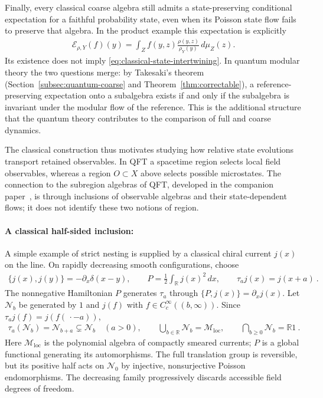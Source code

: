 \documentclass[a4paper,11pt]{article}
\theoremstyle{definition}
\newcommand{\mN}{\mathcal{N}}
\newcommand{\mM}{\mathcal{M}}
\newcommand{\mE}{\mathcal{E}}
\begin{document}
Finally, every classical coarse algebra still admits a state-preserving conditional expectation for a faithful probability state, even when its Poisson state flow fails to preserve that algebra. In the product example this expectation is explicitly
\begin{align}
    \mE_{\rho,Y}(f)(y)=\int_Z f(y,z)\frac{\rho(y,z)}{\rho_Y(y)}\,d\mu_Z(z).
\end{align}
Its existence does not imply \eqref{eq:classical-state-intertwining}. In quantum modular theory the two questions merge: by Takesaki's theorem (Section~\ref{subsec:quantum-coarse} and Theorem~\ref{thm:correctable}), a reference-preserving expectation onto a subalgebra exists if and only if the subalgebra is invariant under the modular flow of the reference. This is the additional structure that the quantum theory contributes to the comparison of full and coarse dynamics.

The classical construction thus motivates studying how relative state evolutions transport retained observables. In QFT a spacetime region selects local field observables, whereas a region $O\subset X$ above selects possible microstates. The connection to the subregion algebras of QFT, developed in the companion paper~\cite{companionQFT}, is through inclusions of observable algebras and their state-dependent flows; it does not identify these two notions of region.

\paragraph{A classical half-sided inclusion:}
A simple example of strict nesting is supplied by a classical chiral current $j(x)$ on the line. On rapidly decreasing smooth configurations, choose
\begin{align}
    \{j(x),j(y)\}=-\partial_x\delta(x-y),
    \qquad P=\frac12\int_{\mathbb R}j(x)^2\,dx,
    \qquad \tau_a j(x)=j(x+a)\ .
\end{align}
The nonnegative Hamiltonian $P$ generates $\tau_a$ through $\{P,j(x)\}=\partial_xj(x)$. Let $\mN_b$ be generated by $1$ and $j(f)$ with $f\in C_c^\infty((b,\infty))$. Since $\tau_a j(f)=j(f(\,\cdot-a))$,
\begin{align}
    \tau_a(\mN_b)=\mN_{b+a}\subsetneq\mN_b\quad(a>0),
    \qquad
    \bigcup_{b\in\mathbb R}\mN_b=\mM_{\mathrm{loc}},
    \qquad
    \bigcap_{b\geq0}\mN_b=\mathbb R1\ .
\end{align}
Here $\mM_{\mathrm{loc}}$ is the polynomial algebra of compactly smeared currents; $P$ is a global functional generating its automorphisms. The full translation group is reversible, but its positive half acts on $\mN_0$ by injective, nonsurjective Poisson endomorphisms. The decreasing family progressively discards accessible field degrees of freedom.
\end{document}
